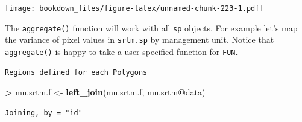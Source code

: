 \documentclass[
]{krantz}
\makeatletter
\newenvironment{Shaded}{\begin{snugshade}}{\end{snugshade}}
\newcommand{\ControlFlowTok}[1]{\textcolor[rgb]{0.27,0.27,0.27}{\textbf{#1}}}
\newcommand{\DataTypeTok}[1]{\textcolor[rgb]{0.27,0.27,0.27}{#1}}
\newcommand{\ErrorTok}[1]{\textcolor[rgb]{0.14,0.14,0.14}{\textbf{#1}}}
\newcommand{\KeywordTok}[1]{\textcolor[rgb]{0.27,0.27,0.27}{\textbf{#1}}}
\newcommand{\NormalTok}[1]{#1}
\newcommand{\OperatorTok}[1]{\textcolor[rgb]{0.43,0.43,0.43}{\textbf{#1}}}
\newcommand{\StringTok}[1]{\textcolor[rgb]{0.5,0.5,0.5}{#1}}
\newenvironment{kframe}{%
\medskip{}
\setlength{\fboxsep}{.8em}
 \def\at@end@of@kframe{}%
 \ifinner\ifhmode%
  \def\at@end@of@kframe{\end{minipage}}%
  \begin{minipage}{\columnwidth}%
 \fi\fi%
 \def\FrameCommand##1{\hskip\@totalleftmargin \hskip-\fboxsep
 \colorbox{shadecolor}{##1}\hskip-\fboxsep
     \hskip-\linewidth \hskip-\@totalleftmargin \hskip\columnwidth}%
 \MakeFramed {\advance\hsize-\width
   \@totalleftmargin\z@ \linewidth\hsize
   \@setminipage}}%
 {\par\unskip\endMakeFramed%
 \at@end@of@kframe}
\renewenvironment{Shaded}{\begin{kframe}}{\end{kframe}}
\makeatother
\begin{document}
\texttt{[image: bookdown\_files/figure-latex/unnamed-chunk-223-1.pdf]}

The \texttt{aggregate()} function will work with all \texttt{sp} objects. For example let's map the variance of pixel values in \texttt{srtm.sp} by management unit. Notice that \texttt{aggregate()} is happy to take a user-specified function for \texttt{FUN}.

\begin{Shaded}
\end{Shaded}

\begin{verbatim}
Regions defined for each Polygons
\end{verbatim}

\begin{Shaded}
\begin{Highlighting}[]
\OperatorTok{\textgreater{}}\StringTok{ }\NormalTok{mu.srtm.f \textless{}{-}}\StringTok{ }\KeywordTok{left\_join}\NormalTok{(mu.srtm.f, mu.srtm}\OperatorTok{@}\NormalTok{data)}
\end{Highlighting}
\end{Shaded}

\begin{verbatim}
Joining, by = "id"
\end{verbatim}
\end{document}
